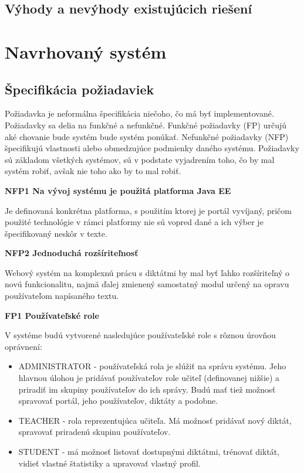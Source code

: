 \documentclass[12pt,oneside]{fithesis2}
\begin{document}
       		\subsection{Výhody a nevýhody existujúcich riešení}
       \section{Navrhovaný systém}
       		\subsection{Špecifikácia požiadaviek} \label{spec-app}
\par Požiadavka je neformálna špecifikácia niečoho, čo má byť implementované. Požiadavky sa delia na funkčné a nefunkčné. Funkčné požiadavky (FP) určujú aké chovanie bude systém bude systém ponúkať. Nefunkčné požiadavky (NFP) špecifikujú vlastnosti alebo obmedzujúce podmienky daného systému. Požiadavky sú základom všetkých systémov, sú v podstate vyjadrením toho, čo by mal systém robiť, avšak nie toho ako by to mal robiť\cite{arlow11}.
       		
\bigskip
     \textbf{NFP1 Na vývoj systému je použitá platforma Java EE}
     \par Je definovaná konkrétna platforma, s použitím ktorej je portál vyvíjaný, pričom použité technológie v rámci platformy nie sú vopred dané a ich výber je špecifikovaný neskôr v texte.
     
\bigskip
     \textbf{NFP2 Jednoduchá rozšíriteľnosť}      		
	\par Webový systém na komplexnú prácu s diktátmi by mal byť ľahko rozšíriteľný o novú funkcionalitu, najmä ďalej zmienený samostatný modul určený na opravu používateľom napísaného textu.
	
\bigskip
     \textbf{FP1 Používateľské role}  
     \par V systéme budú vytvorené nasledujúce používateľské role s rôznou úrovňou oprávnení:
\begin{itemize}
	\item ADMINISTRATOR - používateľská rola je slúžiť na správu systému. Jeho hlavnou úlohou je pridávať používateľov role učiteľ (definovanej nižšie) a priradiť im skupiny používateľov do ich správy. Budú mať tiež možnosť spravovať portál, jeho používateľov, diktáty a podobne.
	\item TEACHER - rola reprezentujúca učiteľa. Má možnosť pridávať nový diktát, spravovať priradenú skupinu používateľov.
	\item STUDENT - má možnosť listovať dostupnými diktátmi, trénovať diktát, vidieť vlastné štatistiky a upravovať vlastný profil.
\end{itemize}
\end{document}
